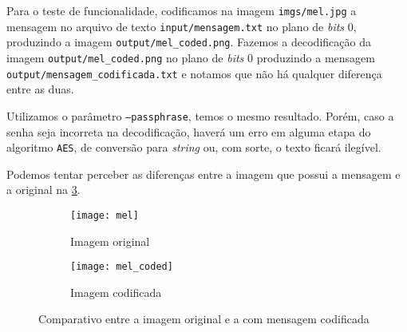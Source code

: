 \documentclass[brazilian,a4paper,twocolumn]{article}
\begin{document}
        Para o teste de funcionalidade, codificamos na imagem \texttt{imgs/mel.jpg} a mensagem no arquivo de texto \texttt{input/mensagem.txt} no plano de \textit{bits} 0, produzindo a imagem \texttt{output/mel_coded.png}. Fazemos a decodificação da imagem \texttt{output/mel_coded.png} no plano de \textit{bits} 0 produzindo a mensagem \texttt{output/mensagem_codificada.txt} e notamos que não há qualquer diferença entre as duas.

        Utilizamos o parâmetro \texttt{---passphrase}, temos o mesmo resultado. Porém, caso a senha seja incorreta na decodificação, haverá um erro em alguma etapa do algoritmo \texttt{AES}, de conversão para \textit{string} ou, com sorte, o texto ficará ilegível.

        Podemos tentar perceber as diferenças entre a imagem que possui a mensagem e a original na \cref{fig:mel-comparativo}.

        \begin{figure}[h]
            \centering
            \begin{subfigure}{0.23\textwidth}
                \texttt{[image: mel]}
                \caption{Imagem original}
                \label{fig:mel-original}
            \end{subfigure}
            \hfill
            \begin{subfigure}{0.23\textwidth}
                \texttt{[image: mel\_coded]}
                \caption{Imagem codificada}
                \label{fig:mel-coded}
            \end{subfigure}

            \caption{Comparativo entre a imagem original e a com mensagem codificada}
            \label{fig:mel-comparativo}
        \end{figure}


    \label{sec:efeito-plano-bits}
\end{document}

